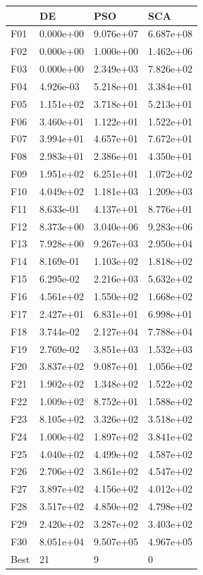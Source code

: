 \begin{tabular}{llll}
\toprule
{} &         DE &        PSO &        SCA \\
\midrule
F01  &  0.000e+00 &  9.076e+07 &  6.687e+08 \\
F02  &  0.000e+00 &  1.000e+00 &  1.462e+06 \\
F03  &  0.000e+00 &  2.349e+03 &  7.826e+02 \\
F04  &  4.926e-03 &  5.218e+01 &  3.384e+01 \\
F05  &  1.151e+02 &  3.718e+01 &  5.213e+01 \\
F06  &  3.460e+01 &  1.122e+01 &  1.522e+01 \\
F07  &  3.994e+01 &  4.657e+01 &  7.672e+01 \\
F08  &  2.983e+01 &  2.386e+01 &  4.350e+01 \\
F09  &  1.951e+02 &  6.251e+01 &  1.072e+02 \\
F10  &  4.049e+02 &  1.181e+03 &  1.209e+03 \\
F11  &  8.633e-01 &  4.137e+01 &  8.776e+01 \\
F12  &  8.373e+00 &  3.040e+06 &  9.283e+06 \\
F13  &  7.928e+00 &  9.267e+03 &  2.950e+04 \\
F14  &  8.169e-01 &  1.103e+02 &  1.818e+02 \\
F15  &  6.295e-02 &  2.216e+03 &  5.632e+02 \\
F16  &  4.561e+02 &  1.550e+02 &  1.668e+02 \\
F17  &  2.427e+01 &  6.831e+01 &  6.998e+01 \\
F18  &  3.744e-02 &  2.127e+04 &  7.788e+04 \\
F19  &  2.769e-02 &  3.851e+03 &  1.532e+03 \\
F20  &  3.837e+02 &  9.087e+01 &  1.056e+02 \\
F21  &  1.902e+02 &  1.348e+02 &  1.522e+02 \\
F22  &  1.009e+02 &  8.752e+01 &  1.588e+02 \\
F23  &  8.105e+02 &  3.326e+02 &  3.518e+02 \\
F24  &  1.000e+02 &  1.897e+02 &  3.841e+02 \\
F25  &  4.040e+02 &  4.499e+02 &  4.587e+02 \\
F26  &  2.706e+02 &  3.861e+02 &  4.547e+02 \\
F27  &  3.897e+02 &  4.156e+02 &  4.012e+02 \\
F28  &  3.517e+02 &  4.850e+02 &  4.798e+02 \\
F29  &  2.420e+02 &  3.287e+02 &  3.403e+02 \\
F30  &  8.051e+04 &  9.507e+05 &  4.967e+05 \\
Best &         21 &          9 &          0 \\
\bottomrule
\end{tabular}
